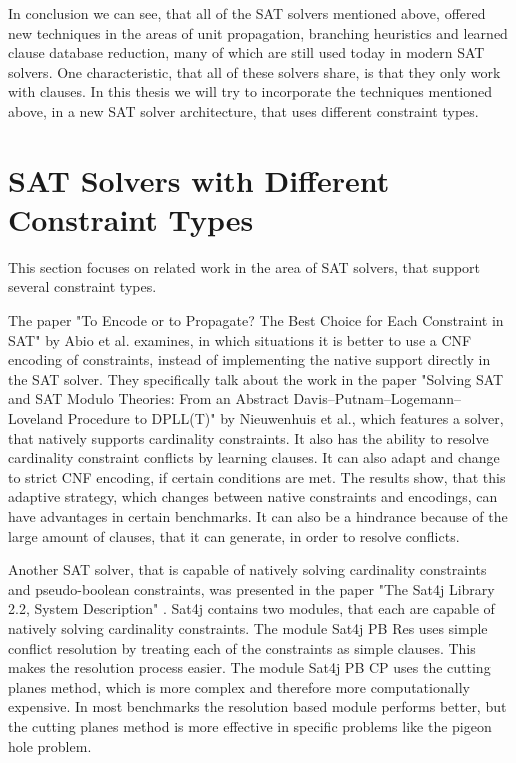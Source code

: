 In conclusion we can see, that all of the SAT solvers mentioned above, offered new techniques in the areas of unit propagation, branching heuristics and learned clause database reduction, many of which are still used today in modern SAT solvers. One characteristic, that all of these solvers share, is that they only work with clauses. In this thesis we will try to incorporate the techniques mentioned above, in a new SAT solver architecture, that uses different constraint types.

\section{SAT Solvers with Different Constraint Types}
This section focuses on related work in the area of SAT solvers, that support several constraint types.

The paper "To Encode or to Propagate? The Best Choice for Each Constraint in SAT" \cite{abio2013encode} by Abio et al. examines, in which situations it is better to use a CNF encoding of constraints, instead of implementing the native support directly in the SAT solver. They specifically talk about the work in the paper "Solving SAT and SAT Modulo Theories: From an Abstract
Davis–Putnam–Logemann–Loveland Procedure to DPLL(T)" \cite{nieuwenhuis2006solving} by Nieuwenhuis et al., which features a solver, that natively supports cardinality constraints. It also has the ability to resolve cardinality constraint conflicts by learning clauses. It can also adapt and change to strict CNF encoding, if certain conditions are met. The results show, that this adaptive strategy, which changes between native constraints and encodings, can have advantages in certain benchmarks. It can also be a hindrance because of the large amount of clauses, that it can generate, in order to resolve conflicts.

Another SAT solver, that is capable of natively solving cardinality constraints and pseudo-boolean constraints, was presented in the paper "The Sat4j Library 2.2, System Description" \cite{le2010sat4j}. Sat4j contains two modules, that each are capable of natively solving cardinality constraints. The module Sat4j PB Res uses simple conflict resolution by treating each of the constraints as simple clauses. This makes the resolution process easier. The module Sat4j PB CP uses the cutting planes method, which is more complex and therefore more computationally expensive. In most benchmarks the resolution based module performs better, but the cutting planes method is more effective in specific problems like the pigeon hole problem.

